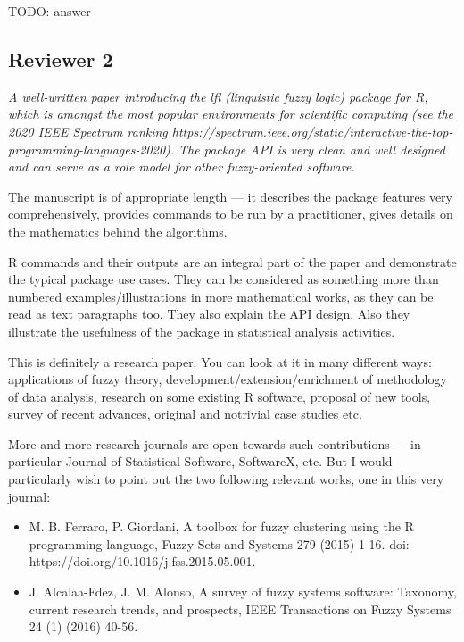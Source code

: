 \documentclass{article}
\newcommand{\todo}[1]{{\color{red} TODO: #1}}
\begin{document}
\todo{answer}



\subsection{Reviewer 2}

{ \it A well-written paper introducing the lfl (linguistic fuzzy logic) package for R, which is amongst the most popular environments for scientific computing (see the 2020 IEEE Spectrum ranking https://spectrum.ieee.org/static/interactive-the-top-programming-languages-2020). The package API is very clean and well designed and can serve as a role model for other fuzzy-oriented software.

The manuscript is of appropriate length — it describes the package features very comprehensively, provides commands to be run by a practitioner, gives details on the mathematics behind the algorithms.

R commands and their outputs are an integral part of the paper and demonstrate the typical package use cases. They can be considered as something more than numbered examples/illustrations in more mathematical works, as they can be read as text paragraphs too. They also explain the API design.
Also they illustrate the usefulness of the package in statistical analysis activities.

This is definitely a research paper. You can look at it in many different ways: applications of fuzzy theory, development/extension/enrichment of methodology of data analysis, research on some existing R software, proposal of new tools, survey of recent advances, original and notrivial case studies etc.

More and more research journals are open towards such contributions — in particular Journal of Statistical Software, SoftwareX, etc. But I would particularly wish to point out the two following relevant works, one in this very journal:

\begin{itemize}
    \item  M. B. Ferraro, P. Giordani, A toolbox for fuzzy clustering using the R programming language, Fuzzy Sets and Systems 279 (2015) 1-16. doi: https://doi.org/10.1016/j.fss.2015.05.001.
    \item J. Alcalaa-Fdez, J. M. Alonso, A survey of fuzzy systems software: Taxonomy, current research trends, and prospects, IEEE Transactions on Fuzzy Systems 24 (1) (2016) 40-56.
\end{itemize}

}
\end{document}
